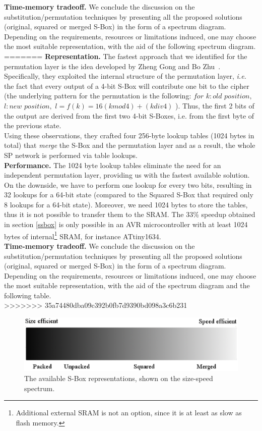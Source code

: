 \documentclass[11pt]{article}
\begin{document}
\textbf{Time-memory tradeoff.} We conclude the discussion on the substitution/permutation techniques by presenting all the proposed solutions (original, squared or merged S-Box) in the form of a spectrum diagram. Depending on the requirements, resources or limitations induced, one may choose the most suitable representation, with the aid of the following spectrum diagram.
=======
\textbf{Representation.} The fastest approach that we identified for the permutation layer is the idea developed by Zheng Gong and Bo Zhu~\cite{gong_code,gong2009towards}. Specifically, they exploited the internal structure of the permutation layer, \emph{i.e.} the fact that every output of a 4-bit S-Box will contribute one bit to the cipher (the underlying pattern for the permutation is the following: $for$ $k:old$ $position,$ $l:new$ $position,$ $l=f(k)=16(k mod 4)+(k div 4)$ ). Thus, the first 2 bits of the output are derived from the first two 4-bit S-Boxes, i.e. from the first byte of the previous state. \\
Using these observations, they crafted four 256-byte lookup tables (1024 bytes in total) that \emph{merge} the S-Box and the permutation layer and as a result, the whole SP network is performed via table lookups.\\
\textbf{Performance.} The 1024 byte lookup tables eliminate the need for an independent permutation layer, providing us with the fastest available solution. On the downside, we have to perform one lookup for every two bits, resulting in 32 lookups for a 64-bit state (compared to the Squared S-Box that required only 8 lookups for a 64-bit state). Moreover, we need 1024 bytes to store the tables, thus it is not possible to transfer them to the SRAM. The 33\% speedup obtained in section \ref{ssbox} is only possible in an AVR microcontroller with at least 1024 bytes of internal\footnote{Additional external SRAM is not an option, since it is at least as slow as flash memory.} SRAM, for instance ATtiny1634.\\
\textbf{Time-memory tradeoff.} We conclude the discussion on the substitution/permutation techniques by presenting all the proposed solutions (original, squared or merged S-Box) in the form of a spectrum diagram. Depending on the requirements, resources or limitations induced, one may choose the most suitable representation, with the aid of the spectrum diagram and the following table.\\
>>>>>>> 35a74480dba09c392b0fb7d9390bd098a3c6b231
\begin{figure}[h]
\centering
\includegraphics[scale=0.3]{spectrum}
\caption{\footnotesize The available S-Box representations, shown on the size-speed spectrum.}
\end{figure}
\end{document}
